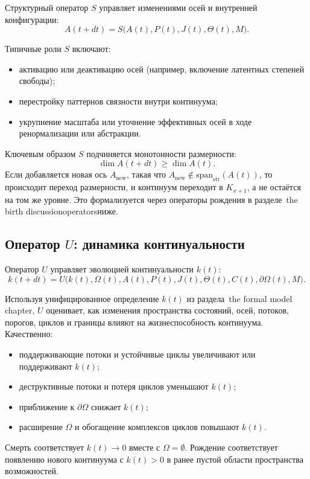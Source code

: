 Структурный оператор \(S\) управляет изменениями осей и внутренней
конфигурации:
\[
  A(t+dt) = S\big(A(t), P(t), J(t), \Theta(t), M\big).
\]

Типичные роли \(S\) включают:
\begin{itemize}
  \item активацию или деактивацию осей (например, включение латентных степеней
        свободы);
  \item перестройку паттернов связности внутри континуума;
  \item укрупнение масштаба или уточнение эффективных осей в ходе
        ренормализации или абстракции.
\end{itemize}

Ключевым образом \(S\) подчиняется монотонности размерности:
\[
  \dim A(t+dt) \ge \dim A(t).
\]
Если добавляется новая ось \(A_{\mathrm{new}}\), такая что
\(A_{\mathrm{new}} \notin \mathrm{span}_{\mathrm{str}}(A(t))\), то
происходит переход размерности, и континуум переходит в \(K_{x+1}\), а не
остаётся на том же уровне. Это формализуется через операторы рождения в
разделе~the birth discussionoperatorsниже.

\subsection{Оператор \texorpdfstring{\texorpdfstring{$U$}{U}}{U}: динамика
континуальности}

Оператор \(U\) управляет эволюцией континуальности \(k(t)\):
\[
  k(t+dt) =
  U\big(k(t), \Omega(t), A(t), P(t), J(t),
        \Theta(t), C(t), \partial\Omega(t), M\big).
\]

Используя унифицированное определение \(k(t)\) из раздела~the formal model chapter,
\(U\) оценивает, как изменения пространства состояний, осей, потоков,
порогов, циклов и границы влияют на жизнеспособность континуума. Качественно:
\begin{itemize}
  \item поддерживающие потоки и устойчивые циклы увеличивают или поддерживают
        \(k(t)\);
  \item деструктивные потоки и потеря циклов уменьшают \(k(t)\);
  \item приближение к \(\partial\Omega\) снижает \(k(t)\);
  \item расширение \(\Omega\) и обогащение комплексов циклов повышают
        \(k(t)\).
\end{itemize}

Смерть соответствует \(k(t) \to 0\) вместе с \(\Omega = \emptyset\).
Рождение соответствует появлению нового континуума с \(k(t) > 0\) в
ранее пустой области пространства возможностей.

